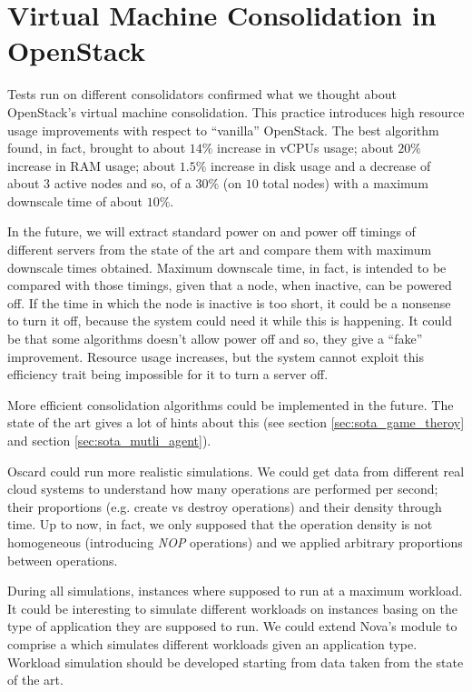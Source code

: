 \section{Virtual Machine Consolidation in OpenStack}
\label{sec:conc_cons}
Tests run on different consolidators confirmed what we thought about OpenStack's virtual machine consolidation. This practice introduces high resource usage improvements with respect to ``vanilla'' OpenStack. The best algorithm found, in fact, brought to about $14\%$ increase in vCPUs usage; about $20\%$ increase in RAM usage; about $1.5\%$ increase in disk usage and a decrease of about $3$ active nodes and so, of a $30\%$ (on $10$ total nodes) with a maximum downscale time of about $10\%$.

In the future, we will extract standard power on and power off timings of different servers from the state of the art and compare them with maximum downscale times obtained. Maximum downscale time, in fact, is intended to be compared with those timings, given that a node, when inactive, can be powered off. If the time in which the node is inactive is too short, it could be a nonsense to turn it off, because the system could need it while this is happening. It could be that some algorithms doesn't allow power off and so, they give a ``fake'' improvement. Resource usage increases, but the system cannot exploit this efficiency trait being impossible for it to turn a server off.

More efficient consolidation algorithms could be implemented in the future. The state of the art gives a lot of hints about this (see section \ref{sec:sota_game_theroy} and section \ref{sec:sota_mutli_agent}). 

Oscard could run more realistic simulations. We could get data from different real cloud systems to understand how many operations are performed per second; their proportions (e.g. create vs destroy operations) and their density through time. Up to now, in fact, we only supposed that the operation density is not homogeneous (introducing \textit{NOP} operations) and we applied arbitrary proportions between operations.

During all simulations, instances where supposed to run at a maximum workload. It could be interesting to simulate different workloads on instances basing on the type of application they are supposed to run. We could extend Nova's  module to comprise a  which simulates different workloads given an application type. Workload simulation should be developed starting from data taken from the state of the art.

